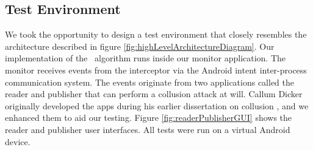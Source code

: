 \subsection{Test Environment}
\label{subsec:RHPracticalPerformanceAnalysisEnvironment}

We took the opportunity to design a test environment that closely resembles the architecture described in figure \ref{fig:highLevelArchitectureDiagram}.  Our implementation of the \RH\ algorithm runs inside our monitor application.  The monitor receives events from the interceptor via the Android intent inter-process communication system.  The events originate from two applications called the reader and publisher that can perform a collusion attack at will.  Callum Dicker originally developed the apps during his earlier dissertation on collusion \cite{Dicker}, and we enhanced them to aid our testing.  Figure \ref{fig:readerPublisherGUI} shows the reader and publisher user interfaces.  All tests were run on a virtual Android device.


